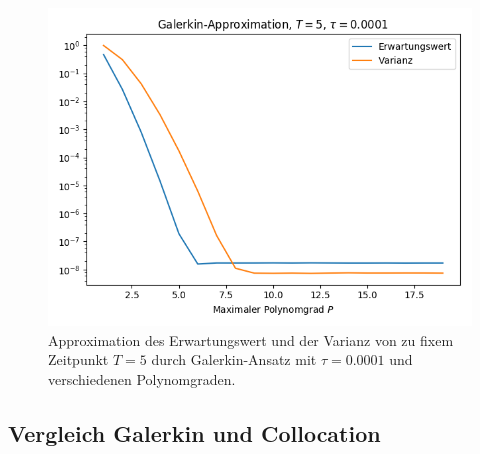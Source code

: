 \begin{figure}[!htb]
\centering
\includegraphics[width=0.5\linewidth]{Figures/galerkin_bydegree_trial1_t5.png}
\caption{Approximation des Erwartungswert und der Varianz von  zu fixem Zeitpunkt $T=5$ durch Galerkin-Ansatz mit $\tau=0.0001$ und verschiedenen Polynomgraden.}
\label{fig:galerkin_bydegree_trial1_t5}
\end{figure}
\subsection{Vergleich Galerkin und Collocation}
